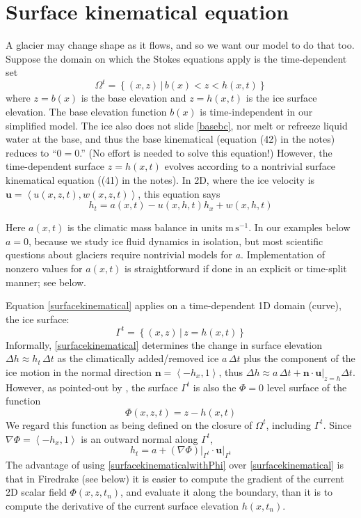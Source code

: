 \documentclass[letterpaper,final,12pt,reqno]{amsart}
\newcommand{\grad}{\nabla}
\newcommand{\bn}{\mathbf{n}}
\newcommand{\bu}{\mathbf{u}}
\begin{document}
\section{Surface kinematical equation}

A glacier may change shape as it flows, and so we want our model to do that too.  Suppose the domain on which the Stokes equations apply is the time-dependent set
\begin{equation}
\Omega^t = \left\{(x,z)\,\big|\, b(x) < z < h(x,t)\right\}  \label{Omegat}
\end{equation}
where $z=b(x)$ is the base elevation and $z=h(x,t)$ is the ice surface elevation.  The base elevation function $b(x)$ is time-independent in our simplified model.  The ice also does not slide \eqref{basebc}, nor melt or refreeze liquid water at the base, and thus the base kinematical (equation (42) in the notes) reduces to ``$0=0$.''  (No effort is needed to solve this equation!)  However, the time-dependent surface $z=h(x,t)$ evolves according to a nontrivial surface kinematical equation ((41) in the notes).  In 2D, where the ice velocity is $\bu=\left<u(x,z,t),w(x,z,t)\right>$, this equation says
\begin{equation}
h_t = a(x,t) - u(x,h,t) h_x + w(x,h,t) \label{surfacekinematical}
\end{equation}

Here $a(x,t)$ is the climatic mass balance in units $\text{m}\,\text{s}^{-1}$.  In our examples below $a=0$, because we study ice fluid dynamics in isolation, but most scientific questions about glaciers require nontrivial models for $a$.  Implementation of nonzero values for $a(x,t)$ is straightforward if done in an explicit or time-split manner; see below.

Equation \eqref{surfacekinematical} applies on a time-dependent 1D domain (curve), the ice surface:
    $$\Gamma^t = \left\{(x,z) \,\big|\, z = h(x,t)\right\}$$
Informally, \eqref{surfacekinematical} determines the change in surface elevation $\Delta h \approx h_t\,\Delta t$ as the climatically added/removed ice $a\,\Delta t$ plus the component of the ice motion in the normal direction $\bn = \left<-h_x,1\right>$, thus $\Delta h \approx a \,\Delta t + \bn\cdot \bu\big|_{z=h} \Delta t$.  However, as pointed-out by \cite[pp.~65--66]{GreveBlatter2009}, the surface $\Gamma^t$ is also the $\Phi=0$ level surface of the function
    $$\Phi(x,z,t) = z - h(x,t)$$
We regard this function as being defined on the closure of $\Omega^t$, including $\Gamma^t$.  Since $\grad \Phi = \left<-h_x,1\right>$ is an outward normal along $\Gamma^t$,
\begin{equation}
h_t = a + (\grad \Phi)\big|_{\Gamma^t} \cdot \bu\big|_{\Gamma^t}  \label{surfacekinematicalwithPhi}
\end{equation}
The advantage of using \eqref{surfacekinematicalwithPhi} over \eqref{surfacekinematical} is that in Firedrake (see below) it is easier to compute the gradient of the current 2D scalar field $\Phi(x,z,t_n)$, and evaluate it along the boundary, than it is to compute the derivative of the current surface elevation $h(x,t_n)$.
\end{document}
